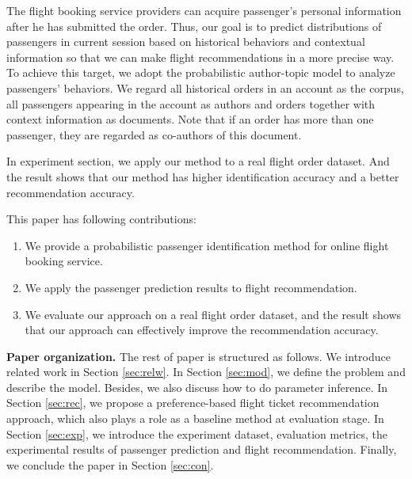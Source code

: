\documentclass{llncs}
\begin{document}
 The flight booking service providers can acquire passenger's personal information after he has submitted the order. Thus, our goal is to predict distributions of passengers in current session based on historical behaviors and contextual information so that we can make flight recommendations in a more precise way. To achieve this target, we adopt the probabilistic author-topic model to analyze passengers' behaviors. We regard all historical orders in an account as the corpus, all passengers appearing in the account as authors and orders together with context information as documents. Note that if an order has more than one passenger, they are regarded as co-authors of this document.\par
 In experiment section, we apply our method to a real flight order dataset.  And the result shows that our method has higher identification accuracy and a better recommendation accuracy.\par
 This paper has following contributions:\\
\begin{enumerate}
\item We provide a probabilistic passenger identification method for online flight booking service.
\item We apply the passenger prediction results to flight recommendation.
\item We evaluate our approach on a real flight order dataset, and the result shows that our approach can effectively improve the recommendation accuracy.
\end{enumerate}

\textbf{Paper organization.} The rest of paper is structured as follows. We introduce related work in Section \ref{sec:relw}. In Section \ref{sec:mod}, we define the problem and describe the model. Besides, we also discuss how to do parameter inference. In Section \ref{sec:rec}, we propose a preference-based flight ticket recommendation approach, which also plays a role as a baseline method at evaluation stage. In Section \ref{sec:exp}, we introduce the experiment dataset, evaluation metrics, the experimental results of passenger prediction and flight recommendation. Finally, we conclude the paper in Section \ref{sec:con}.
\end{document}
